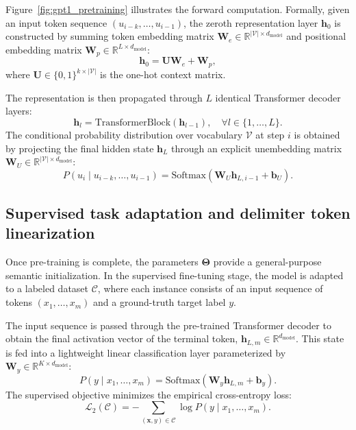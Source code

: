 \documentclass[../../main.tex]{subfiles}
\begin{document}
Figure~\ref{fig:gpt1_pretraining} illustrates the forward computation. Formally, given an input token sequence $(u_{i-k}, \dots, u_{i-1})$, the zeroth representation layer $\mathbf{h}_0$ is constructed by summing token embedding matrix $\mathbf{W}_e \in \mathbb{R}^{|\mathcal{V}| \times d_{\text{model}}}$ and positional embedding matrix $\mathbf{W}_p \in \mathbb{R}^{L \times d_{\text{model}}}$:
\begin{equation}
\mathbf{h}_0 = \mathbf{U} \mathbf{W}_e + \mathbf{W}_p,
\label{eq:gpt1_input_representation}
\end{equation}
where $\mathbf{U} \in \{0, 1\}^{k \times |\mathcal{V}|}$ is the one-hot context matrix.

The representation is then propagated through $L$ identical Transformer decoder layers:
\begin{equation}
\mathbf{h}_l = \text{TransformerBlock}(\mathbf{h}_{l-1}), \quad \forall l \in \{1, \dots, L\}.
\label{eq:gpt1_layer_pass}
\end{equation}
The conditional probability distribution over vocabulary $\mathcal{V}$ at step $i$ is obtained by projecting the final hidden state $\mathbf{h}_L$ through an explicit unembedding matrix $\mathbf{W}_U \in \mathbb{R}^{|\mathcal{V}| \times d_{\text{model}}}$:
\begin{equation}
P(u_i \mid u_{i-k}, \dots, u_{i-1}) = \text{Softmax}(\mathbf{W}_U \mathbf{h}_{L, i-1} + \mathbf{b}_U).
\label{eq:gpt1_output_prob}
\end{equation}


\subsection{Supervised task adaptation and delimiter token linearization}
\label{subsec:gpt1_finetuning}

Once pre-training is complete, the parameters $\boldsymbol{\Theta}$ provide a general-purpose semantic initialization. In the supervised fine-tuning stage, the model is adapted to a labeled dataset $\mathcal{C}$, where each instance consists of an input sequence of tokens $(x_1, \dots, x_m)$ and a ground-truth target label $y$.

The input sequence is passed through the pre-trained Transformer decoder to obtain the final activation vector of the terminal token, $\mathbf{h}_{L, m} \in \mathbb{R}^{d_{\text{model}}}$. This state is fed into a lightweight linear classification layer parameterized by $\mathbf{W}_y \in \mathbb{R}^{K \times d_{\text{model}}}$:
\begin{equation}
P(y \mid x_1, \dots, x_m) = \text{Softmax}(\mathbf{W}_y \mathbf{h}_{L, m} + \mathbf{b}_y).
\label{eq:gpt1_supervised_prob}
\end{equation}
The supervised objective minimizes the empirical cross-entropy loss:
\begin{equation}
\mathcal{L}_2(\mathcal{C}) = -\sum_{(\mathbf{x}, y) \in \mathcal{C}} \log P(y \mid x_1, \dots, x_m).
\label{eq:gpt1_supervised_loss}
\end{equation}
\end{document}
